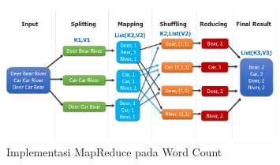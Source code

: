 \begin{figure}[h]
    \centering
    \includegraphics[width=0.8\textwidth]{figures/ch02/map-reduce-word-count-oreilly.png}
    \caption{Implementasi MapReduce pada Word Count \cite{MapReduceDistributedComputing}}
    \label{fig:mapreduce-wordcount}
\end{figure}


%
%
%


